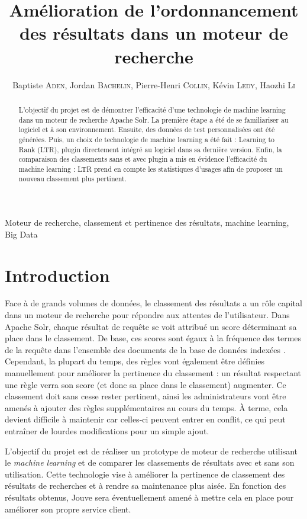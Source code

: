 \documentclass[twocolumn,a4paper]{IEEEtranfr}
\title{Amélioration de l'ordonnancement des résultats dans un moteur de recherche}
\author{Baptiste \textsc{Aden}, Jordan \textsc{Bachelin}, Pierre-Henri \textsc{Collin}, Kévin \textsc{Ledy}, Haozhi \textsc{Li}}
\begin{document}
\maketitle

\begin{abstract}
L'objectif du projet est de démontrer l'efficacité d'une technologie de machine learning dans un moteur de recherche Apache Solr. La première étape a été de se familiariser au logiciel et à son environnement. Ensuite, des données de test personnalisées ont été générées. Puis, un choix de technologie de machine learning a été fait : Learning to Rank (LTR), plugin directement intégré au logiciel dans sa dernière version. Enfin, la comparaison des classements sans et avec plugin a mis en évidence l'efficacité du machine learning : LTR prend en compte les statistiques d'usages afin de proposer un nouveau classement plus pertinent.
\end{abstract} 

\begin{keywords}
Moteur de recherche, classement et pertinence des résultats, machine learning, Big Data
\end{keywords}

\section{Introduction}
Face à de grands volumes de données, le classement des résultats a un rôle capital dans un moteur de recherche pour répondre aux attentes de l'utilisateur. Dans Apache Solr, chaque résultat de requête se voit attribué un score déterminant sa place dans le classement. De base, ces scores sont égaux à la fréquence des termes de la requête dans l'ensemble des documents de la base de données indexées \cite{docTFIDF}. Cependant, la plupart du temps, des règles vont également être définies manuellement pour améliorer la pertinence du classement : un résultat respectant une règle verra son score (et donc sa place dans le classement) augmenter. Ce classement doit sans cesse rester pertinent, ainsi les administrateurs vont être amenés à ajouter des règles supplémentaires au cours du temps. À terme, cela devient difficile à maintenir car celles-ci peuvent entrer en conflit, ce qui peut entraîner de lourdes modifications pour un simple ajout.

L'objectif du projet est de réaliser un prototype de moteur de recherche utilisant le \textit{machine learning} et de comparer les classements de résultats avec et sans son utilisation. Cette technologie vise à améliorer la pertinence de classement des résultats de recherches et à rendre sa maintenance plus aisée. En fonction des résultats obtenus, Jouve sera éventuellement amené à mettre cela en place pour améliorer son propre service client.
\end{document}
